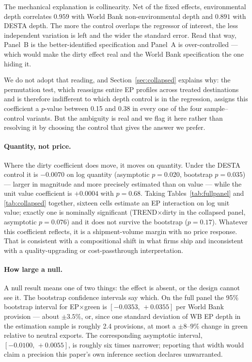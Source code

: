 \documentclass[11pt]{article}
\begin{document}
The mechanical explanation is collinearity. Net of the fixed effects, environmental depth
correlates $0.959$ with World Bank non-environmental depth and $0.891$ with DESTA depth. The more
the control overlaps the regressor of interest, the less independent variation is left and the
wider the standard error. Read that way, Panel~B is the better-identified specification and Panel~A
is over-controlled --- which would make the dirty effect real and the World Bank specification the
one hiding it.

We do not adopt that reading, and Section~\ref{sec:collapsed} explains why: the permutation test,
which reassigns entire EP profiles across treated destinations and is therefore indifferent to
which depth control is in the regression, assigns this coefficient a $p$-value between 0.15 and
0.38 in every one of the four sample--control variants. But the ambiguity is real and we flag it
here rather than resolving it by choosing the control that gives the answer we prefer.

\paragraph{Quantity, not price.} Where the dirty coefficient does move, it moves on quantity.
Under the DESTA control it is $-0.0070$ on log quantity (asymptotic $p = 0.020$, bootstrap
$p = 0.035$) --- larger in magnitude and more precisely estimated than on value --- while the unit
value coefficient is $+0.0004$ with $p = 0.68$. Taking Tables~\ref{tab:fullpanel} and
\ref{tab:collapsed} together, sixteen cells estimate an EP interaction on log unit value; exactly
one is nominally significant (TREND$\times$dirty in the collapsed panel, asymptotic $p = 0.076$)
and it does not survive the bootstrap ($p = 0.17$). Whatever this coefficient reflects, it is a
shipment-volume margin with no price response. That is consistent with a compositional shift in
what firms ship and inconsistent with a quality-upgrading or cost-passthrough interpretation.

\paragraph{How large a null.} A null result means one of two things: the effect is absent, or the
design cannot see it. The bootstrap confidence intervals say which. On the full panel the 95\%
bootstrap interval for EP$\times$green is $[-0.0353,\, +0.0355]$ per World Bank provision --- about
$\pm 3.5\%$, or, since one standard deviation of WB EP depth in the estimation sample is roughly
2.4 provisions, at most a $\pm 8$--$9\%$ change in green relative to neutral exports. The
corresponding asymptotic interval, $[-0.0100,\, +0.0055]$, is roughly six times narrower; reporting
that width would claim a precision this paper's own inference section declares unwarranted.
\end{document}
